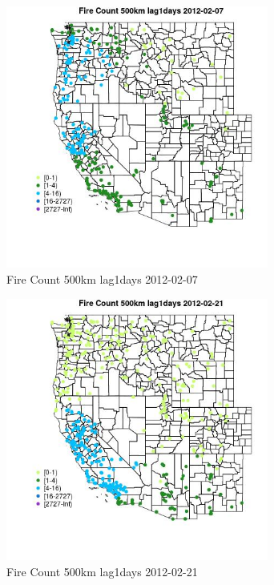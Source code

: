 \begin{figure} 
\centering  
\includegraphics[width=0.77\textwidth]{Code_Outputs/Report_ML_input_PM25_Step4_part_f_de_duplicated_aves_prioritize_24hr_obswNAs_MapObsFire_Count_500km_lag1days2012-02-07.jpg} 
\caption{\label{fig:Report_ML_input_PM25_Step4_part_f_de_duplicated_aves_prioritize_24hr_obswNAsMapObsFire_Count_500km_lag1days2012-02-07}Fire Count 500km lag1days 2012-02-07} 
\end{figure} 
 

\clearpage 

\begin{figure} 
\centering  
\includegraphics[width=0.77\textwidth]{Code_Outputs/Report_ML_input_PM25_Step4_part_f_de_duplicated_aves_prioritize_24hr_obswNAs_MapObsFire_Count_500km_lag1days2012-02-21.jpg} 
\caption{\label{fig:Report_ML_input_PM25_Step4_part_f_de_duplicated_aves_prioritize_24hr_obswNAsMapObsFire_Count_500km_lag1days2012-02-21}Fire Count 500km lag1days 2012-02-21} 
\end{figure} 
 

